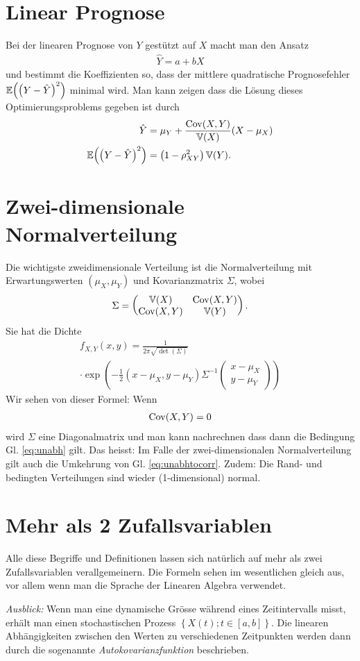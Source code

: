 \section{Linear Prognose}
Bei der linearen Prognose von $Y$ gestützt auf $X$ macht man den Ansatz
\begin{gather*}
	\hat{Y}=a+bX
\end{gather*}
und bestimmt die Koeffizienten so, dass der mittlere quadratische Prognosefehler $\operatorname{\mathbb E}\!\left(\left( Y-\hat{Y} \right)^2  \right)$ minimal wird. Man kann zeigen dass die Lösung dieses Optimierungsproblems gegeben ist durch
\begin{align*}
	\hat{Y}&=\mu_{Y}+\frac{\operatorname{Cov}(X,Y)}{\operatorname{\mathbb V}(X)}(X-\mu_X)\\
	\operatorname{\mathbb E}\!\left(\left( Y-\hat{Y} \right)^2  \right)
	&=\left( 1-\rho_{XY}^{2} \right)\operatorname{\mathbb V}(Y).
\end{align*}
\section{Zwei-dimensionale Normalverteilung}
\label{sec6.6}
Die wichtigste zweidimensionale Verteilung ist die Normalverteilung mit Erwartungswerten $(\mu_{X},\mu_Y)$ und Kovarianzmatrix $\Sigma$, wobei
\begin{gather*}
	\Sigma=
	\begin{pmatrix}
		\operatorname{\mathbb V}(X)&\operatorname{Cov}(X,Y)\\
		\operatorname{Cov}(X,Y)&\operatorname{\mathbb V}(Y)
	\end{pmatrix}.
	\end{gather*}
Sie hat die Dichte
\begin{multline*}
	f_{X,Y}(x,y)=\frac{1}{2\pi\sqrt{\det(\Sigma)}}\\
	 \cdot \exp\!\left( -\frac{1}{2}\left( x-\mu_X,y-\mu_Y \right)\Sigma^{-1}
	\begin{pmatrix}
		x-\mu_X\\
		y-\mu_Y
	\end{pmatrix}
	\right)
\end{multline*}
Wir sehen von dieser Formel: Wenn 
\begin{gather*}
	\operatorname{Cov}(X,Y)=0
\end{gather*}
wird $\Sigma$ eine Diagonalmatrix und man kann nachrechnen dass dann die Bedingung Gl. \ref{eq:unabh} gilt. Das heisst: Im Falle der zwei-dimensionalen Normalverteilung gilt auch die Umkehrung von Gl. \ref{eq:unabhtocorr}. Zudem: Die Rand- und bedingten Verteilungen sind wieder (1-dimensional) normal.
\section{Mehr als 2 Zufallsvariablen}
Alle diese Begriffe und Definitionen lassen sich natürlich auf mehr als zwei Zufallsvariablen verallgemeinern. Die Formeln sehen im wesentlichen gleich aus, vor allem wenn man die Sprache der Linearen Algebra verwendet.

\emph{Ausblick:} Wenn man eine dynamische Grösse während eines Zeitintervalls misst, erhält man einen stochastischen Prozess $\left\{ X(t); t\in \left[ a,b \right] \right\}$. Die linearen Abhängigkeiten zwischen den Werten zu verschiedenen Zeitpunkten werden dann durch die sogenannte \emph{Autokovarianzfunktion} beschrieben.
